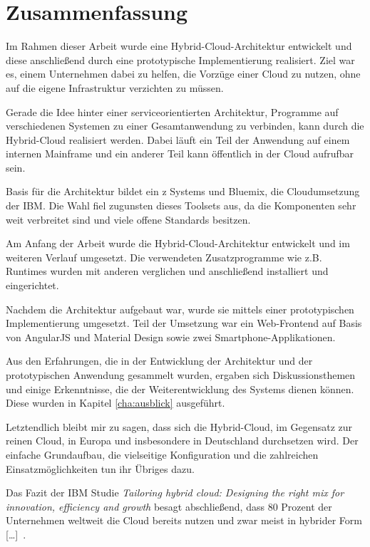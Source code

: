 \chapter{Zusammenfassung}
\label{cha:zusammenfassung}

Im Rahmen dieser Arbeit wurde eine Hybrid-Cloud-Architektur entwickelt und diese anschließend durch eine prototypische
Implementierung realisiert. Ziel war es, einem Unternehmen dabei zu helfen, die Vorzüge einer Cloud zu nutzen, ohne auf
die eigene Infrastruktur verzichten zu müssen.

Gerade die Idee hinter einer serviceorientierten Architektur, Programme auf verschiedenen Systemen zu einer Gesamtanwendung
zu verbinden, kann durch die Hybrid-Cloud realisiert werden. Dabei läuft ein Teil der Anwendung auf einem
internen Mainframe und ein anderer Teil kann öffentlich in der Cloud aufrufbar sein.

Basis für die Architektur bildet ein z Systems und Bluemix, die Cloudumsetzung der IBM. Die Wahl fiel zugunsten
dieses Toolsets aus, da die Komponenten sehr weit verbreitet sind und viele offene Standards besitzen.

Am Anfang der Arbeit wurde die Hybrid-Cloud-Architektur entwickelt und im weiteren Verlauf umgesetzt. Die verwendeten
Zusatzprogramme wie z.B. Runtimes wurden mit anderen verglichen und anschließend installiert und eingerichtet.

Nachdem die Architektur aufgebaut war, wurde sie mittels einer prototypischen Implementierung umgesetzt. Teil der Umsetzung
war ein Web-Frontend auf Basis von AngularJS und Material Design sowie zwei Smartphone-Applikationen.

Aus den Erfahrungen, die in der Entwicklung der Architektur und der prototypischen Anwendung gesammelt wurden, ergaben
sich Diskussionsthemen und einige Erkenntnisse, die der Weiterentwicklung des Systems dienen können. Diese wurden in
Kapitel \ref{cha:ausblick} ausgeführt.

Letztendlich bleibt mir zu sagen, dass sich die Hybrid-Cloud, im Gegensatz zur reinen Cloud, in Europa und insbesondere
in Deutschland durchsetzen wird. Der einfache Grundaufbau, die vielseitige Konfiguration und die zahlreichen
Einsatzmöglichkeiten tun ihr Übriges dazu.

Das Fazit der IBM Studie \textit{Tailoring hybrid cloud: Designing the right mix for innovation, efficiency and growth}
besagt abschließend, \glqq [\ldots] dass 80 Prozent der Unternehmen weltweit die Cloud bereits nutzen und zwar meist in
hybrider Form [\ldots]\grqq~\cite{online_ausblick_fazit}.